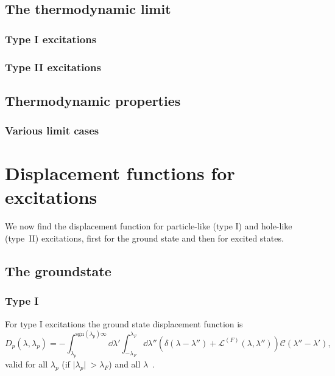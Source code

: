 \documentclass[11pt, a4paper]{report} %
\newcommand{\inversetruncc}{\mathcal{L}}
\newcommand{\kernel}{\mathcal{C}}
\begin{document}
\subsection{The thermodynamic limit}

\subsubsection{Type I excitations}

\subsubsection{Type II excitations}

\subsection{Thermodynamic properties}

\subsubsection{Various limit cases}


\section{Displacement functions for excitations}
We now find the displacement function for particle-like (type I) and hole-like (type~II) excitations, first for the ground state and then for excited states.

\subsection{The groundstate}
\subsubsection{Type I}
For type I excitations the ground state displacement function is 
\begin{equation}\label{eq:particledisplacement}
	D_p(\lambda, \lambda_p) = - \int_{\lambda_p}^{\textrm{sgn}(\lambda_p)\infty} \dd \lambda' \int_{-\lambda_F}^{\lambda_F} \dd  \lambda'' \left(\delta(\lambda-\lambda'') + \inversetruncc^{(F)}(\lambda,\lambda'') \right)\kernel(\lambda''-\lambda'),
\end{equation}
valid for all \(\lambda_p\) (if \(\lvert \lambda_p \rvert\ > \lambda_F\)) and all \(\lambda\)~\cite{tofind}.
\end{document}
